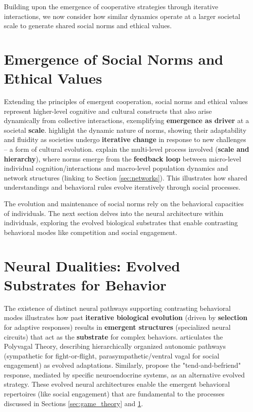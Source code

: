 Building upon the emergence of cooperative strategies through iterative interactions, we now consider how similar dynamics operate at a larger societal scale to generate shared social norms and ethical values.

\section{Emergence of Social Norms and Ethical Values} \label{sec:social_norms}
Extending the principles of emergent cooperation, social norms and ethical values represent higher-level cognitive and cultural constructs that also arise dynamically from collective interactions, exemplifying \textbf{emergence as driver} at a societal \textbf{scale}. \citet{vriens2024social} highlight the dynamic nature of norms, showing their adaptability and fluidity as societies undergo \textbf{iterative change} in response to new challenges – a form of cultural evolution. \citet{hawkins2019emergence} explain the multi-level process involved (\textbf{scale and hierarchy}), where norms emerge from the \textbf{feedback loop} between micro-level individual cognition/interactions and macro-level population dynamics and network structures (linking to Section \ref{sec:networks}). This illustrates how shared understandings and behavioral rules evolve iteratively through social processes.

The evolution and maintenance of social norms rely on the behavioral capacities of individuals. The next section delves into the neural architecture within individuals, exploring the evolved biological substrates that enable contrasting behavioral modes like competition and social engagement.

\section{Neural Dualities: Evolved Substrates for Behavior} \label{sec:neural}
The existence of distinct neural pathways supporting contrasting behavioral modes illustrates how past \textbf{iterative biological evolution} (driven by \textbf{selection} for adaptive responses) results in \textbf{emergent structures} (specialized neural circuits) that act as the \textbf{substrate} for complex behaviors. \citet{porges2009polyvagal} articulates the Polyvagal Theory, describing hierarchically organized autonomic pathways (sympathetic for fight-or-flight, parasympathetic/ventral vagal for social engagement) as evolved adaptations. Similarly, \citet{taylor2000biobehavioral} propose the "tend-and-befriend" response, mediated by specific neuroendocrine systems, as an alternative evolved strategy. These evolved neural architectures enable the emergent behavioral repertoires (like social engagement) that are fundamental to the processes discussed in Sections \ref{sec:game_theory} and \ref{sec:social_norms}.

